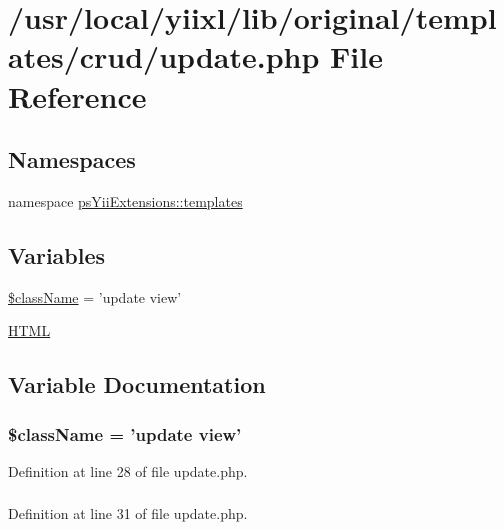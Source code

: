 \hypertarget{update_8php}{
\section{/usr/local/yiixl/lib/original/templates/crud/update.php File Reference}
\label{update_8php}
}
\subsection*{Namespaces}
\begin{DoxyCompactItemize}
\item 
namespace \hyperlink{namespacepsYiiExtensions_1_1templates}{psYiiExtensions::templates}
\end{DoxyCompactItemize}
\subsection*{Variables}
\begin{DoxyCompactItemize}
\item 
\hyperlink{update_8php_acd6a475a6eeb092f4eea3e19e502d67d}{\$className} = 'update view'
\item 
\hyperlink{update_8php_a2c8135527015cd4586959ac7c2ffec92}{HTML}
\end{DoxyCompactItemize}


\subsection{Variable Documentation}
\hypertarget{update_8php_acd6a475a6eeb092f4eea3e19e502d67d}{
\subsubsection[{\$className}]{\setlength{\rightskip}{0pt plus 5cm}\$className = 'update view'}}
\label{update_8php_acd6a475a6eeb092f4eea3e19e502d67d}


Definition at line 28 of file update.php.

\hypertarget{update_8php_a2c8135527015cd4586959ac7c2ffec92}{
\subsubsection[{HTML}]{}}
\label{update_8php_a2c8135527015cd4586959ac7c2ffec92}


Definition at line 31 of file update.php.

